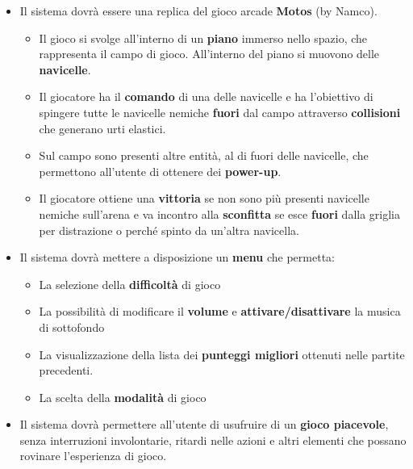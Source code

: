 	\begin{itemize}
	    \item Il sistema dovrà essere una replica del gioco arcade \textbf{Motos} (by Namco).
            \begin{itemize}
                \item Il gioco si svolge all'interno di un \textbf{piano} immerso nello spazio, che rappresenta il campo di gioco. All'interno del piano si muovono delle \textbf{navicelle}.
                
                \item Il giocatore ha il \textbf{comando} di una delle navicelle e ha l'obiettivo di spingere tutte le navicelle nemiche \textbf{fuori} dal campo attraverso \textbf{collisioni} che generano urti elastici.
                
                \item Sul campo sono presenti altre entità, al di fuori delle navicelle, che permettono all'utente di ottenere dei \textbf{power-up}.
                
                \item  Il giocatore ottiene una \textbf{vittoria} se non sono più presenti navicelle nemiche sull'arena e va incontro alla \textbf{sconfitta} se esce \textbf{fuori} dalla griglia per distrazione o perché spinto da un'altra navicella.
            \end{itemize}
        
        \item Il sistema dovrà mettere a disposizione un \textbf{menu} che permetta:
            \begin{itemize}
                \item La selezione della \textbf{difficoltà} di gioco
                
                \item La possibilità di modificare il \textbf{volume} e \textbf{attivare/disattivare} la musica di sottofondo
                
                \item La visualizzazione della lista dei \textbf{punteggi migliori} ottenuti nelle partite precedenti.
                
                \item La scelta della \textbf{modalità} di gioco
            \end{itemize}
            
        \item Il sistema dovrà permettere all'utente di usufruire di un \textbf{gioco piacevole}, senza interruzioni involontarie, ritardi nelle azioni e altri elementi che possano rovinare l'esperienza di gioco.
	\end{itemize}
    
